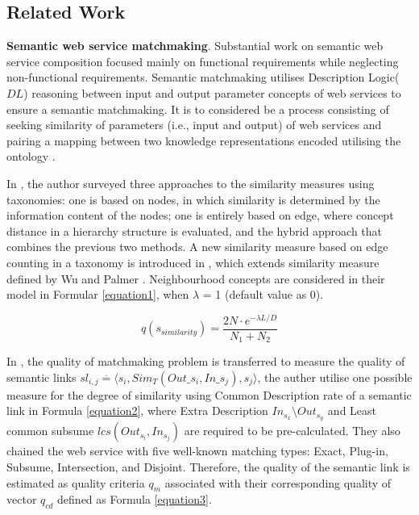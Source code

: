 \documentclass{llncs}
\begin{document}
\subsection{Related Work} \label{relatedWork}
\textbf{Semantic web service matchmaking}. Substantial work \cite{bansal2016generalized,mier2015integrated} on semantic web service composition focused mainly on functional requirements while neglecting non-functional requirements. Semantic matchmaking utilises Description Logic($DL$) \cite{baader2003description} reasoning between input and output parameter concepts of web services to ensure a semantic matchmaking. It is to considered be a process consisting of seeking similarity of parameters (i.e., input and output) of web services and pairing a mapping between two knowledge representations encoded utilising the ontology \cite{lecue2006formal}.

In \cite{shet2012new}, the author surveyed three approaches to the similarity measures using taxonomies: one is based on nodes, in which similarity is determined by the information content of the nodes; one is entirely based on edge, where concept distance in a hierarchy structure is evaluated,  and the hybrid approach that combines the previous two methods. A new similarity measure based on edge counting in a taxonomy is introduced in \cite{shet2012new}, which extends similarity measure defined by Wu and Palmer \cite{wu1994verbs}. Neighbourhood concepts are considered in their model in Formular \ref{equation1}, when $\lambda$ = 1 (default value as 0).

\begin{equation}
q(s_ {similarity}){=} \frac{2N \cdot e^{-\lambda L/D} }{N_{1}+N_{2}}
\label{equation1}
\end{equation}

In \cite{lecue2009optimizing}, the quality of matchmaking problem is transferred to measure the quality of semantic links $sl_{i,j} \stackrel{.}{=} \langle s_{i}, Sim_{T}(Out\_s_i,In\_s_j),s_{j}  \rangle$, the auther utilise one possible measure for the degree of similarity using Common Description rate of a semantic link in Formula \ref{equation2}, where Extra Description $In_{s_{x}} \setminus Out_{s_{y}}$ and Least common subsume $lcs(Out_{s_i},In_{s_j})$ are required to be pre-calculated. They also chained the web service with five well-known matching types: Exact, Plug-in, Subsume, Intersection, and Disjoint. Therefore, the quality of the semantic link is estimated as quality criteria $q_{m}$ associated with their corresponding quality of vector $q_{cd}$ defined as Formula \ref{equation3}.
\end{document}
